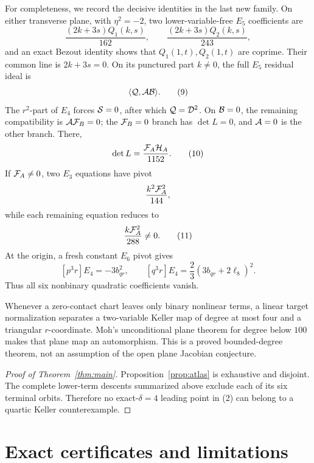 \documentclass[11pt]{article}
\begin{document}
For completeness, we record the decisive identities in the last new
family.  On either transverse plane, with \(\eta^2=-2\), two
lower-variable-free \(E_5\) coefficients are
\[
\frac{(2k+3s)Q_1(k,s)}{162},\qquad
\frac{(2k+3s)Q_2(k,s)}{243},
\tag{8}
\]
and an exact Bezout identity shows that \(Q_1(1,t),Q_2(1,t)\) are
coprime.  Their common line is \(2k+3s=0\).  On its punctured part
\(k\ne0\), the full \(E_5\) residual ideal is
\[
\langle {\cal Q},{\cal A}{\cal B}\rangle.
\tag{9}
\]
The \(r^2\)-part of \(E_4\) forces \({\cal S}=0\), after which
\({\cal Q}={\cal D}^2\).  On \({\cal B}=0\), the remaining
compatibility is \({\cal A}{\cal F}_B=0\); the
\({\cal F}_B=0\) branch has \(\det L=0\), and
\({\cal A}=0\) is the other branch.  There,
\[
\det L=\frac{{\cal F}_A{\cal H}_A}{1152}.
\tag{10}
\]
If \({\cal F}_A\ne0\), two \(E_3\) equations have pivot
\[
\frac{k^2{\cal F}_A^2}{144},
\]
while each remaining equation reduces to
\[
\frac{k{\cal F}_A^2}{288}\ne0.
\tag{11}
\]
At the origin, a fresh constant \(E_6\) pivot gives
\[
[p^3r]E_4=-3b_{qr}^2,\qquad
[q^3r]E_4=\frac23(3b_{qr}+2\ell_8)^2.
\tag{12}
\]
Thus all six nonbinary quadratic coefficients vanish.

Whenever a zero-contact chart leaves only binary nonlinear terms, a
linear target normalization separates a two-variable Keller map of
degree at most four and a triangular \(r\)-coordinate.  Moh's
unconditional plane theorem for degree below \(100\)
\cite{BiggersMohFried1983} makes that plane map an automorphism.  This is
a proved bounded-degree theorem, not an assumption of the open plane
Jacobian conjecture.

\begin{proof}[Proof of Theorem~\ref{thm:main}]
Proposition~\ref{prop:atlas} is exhaustive and disjoint.  The complete
lower-term descents summarized above exclude each of its six terminal
orbits.  Therefore no exact-\(\delta=4\) leading point in (2) can belong
to a quartic Keller counterexample.
\end{proof}

\section{Exact certificates and limitations}
\end{document}

